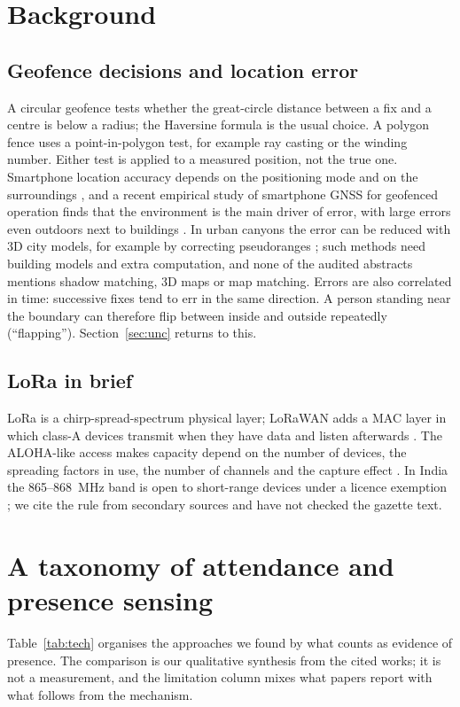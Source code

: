 \documentclass[preprint,12pt]{elsarticle}
\begin{document}
\section{Background}
\subsection{Geofence decisions and location error}
A circular geofence tests whether the great-circle distance between a fix and a centre is below a radius; the Haversine formula \cite{sinnott1984haversine} is the usual choice. A polygon fence uses a point-in-polygon test, for example ray casting or the winding number. Either test is applied to a measured position, not the true one. Smartphone location accuracy depends on the positioning mode and on the surroundings \cite{zandbergen2009iphone,@11,schipperijn2014dynamic}, and a recent empirical study of smartphone GNSS for geofenced operation finds that the environment is the main driver of error, with large errors even outdoors next to buildings \cite{@1596}. In urban canyons the error can be reduced with 3D city models, for example by correcting pseudoranges \cite{@41}; such methods need building models and extra computation, and none of the \nAudit{} audited abstracts mentions shadow matching, 3D maps or map matching. Errors are also correlated in time: successive fixes tend to err in the same direction. A person standing near the boundary can therefore flip between inside and outside repeatedly (``flapping''). Section~\ref{sec:unc} returns to this.

\subsection{LoRa in brief}
LoRa is a chirp-spread-spectrum physical layer; LoRaWAN adds a MAC layer in which class-A devices transmit when they have data and listen afterwards \cite{augustin2016lora,@3,@4}. The ALOHA-like access makes capacity depend on the number of devices, the spreading factors in use, the number of channels and the capture effect \cite{bor2016scale,georgiou2017scale,rahmadhani2018collide}. In India the 865--868~MHz band is open to short-range devices under a licence exemption \cite{dot865}; we cite the rule from secondary sources and have not checked the gazette text.

\section{A taxonomy of attendance and presence sensing}\label{sec:tax}
Table~\ref{tab:tech} organises the approaches we found by what counts as evidence of presence. The comparison is our qualitative synthesis from the cited works; it is not a measurement, and the limitation column mixes what papers report with what follows from the mechanism.
\end{document}
